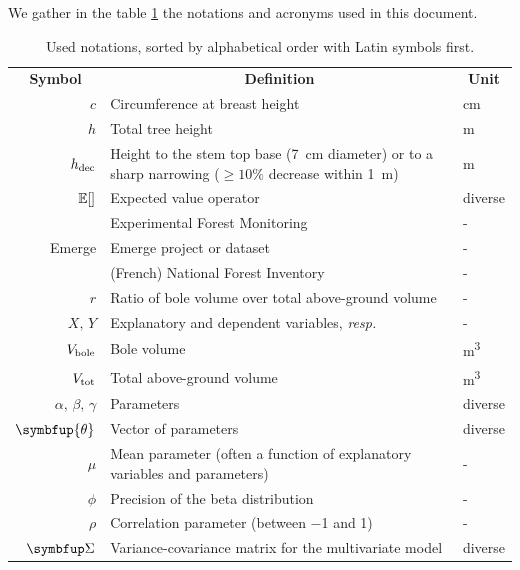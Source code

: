 We gather in the table \ref{tab::notations} the notations and acronyms used in this document.
\begin{table}[h]
	\centering
	\begin{tabular}{@{}rp{10cm}l@{}}
		\toprule
		\multicolumn{1}{c}{\textbf{Symbol}} & \multicolumn{1}{c}{\textbf{Definition}} & \multicolumn{1}{c}{\textbf{Unit}} \\
		\( c \) & Circumference at breast height & \si{\centi\metre} \\
		\( h \) & Total tree height & \si{\metre} \\
		\( h_{\text{dec}} \) & Height to the stem top base (\qty{7}{\centi\metre} diameter) or to a sharp narrowing (\( \geqslant 10\% \) decrease within \qty{1}{\metre}) & \si{\metre} \\
		\( \operatorname{\mathbb{E}}[] \) & Expected value operator & diverse \\
		\EFM & Experimental Forest Monitoring \parencite{Didion2024} & - \\
		Emerge & Emerge project or dataset \parencite{Deleuze2013} & - \\
		\NFI & (French) National Forest Inventory & - \\
		\( r \) & Ratio of bole volume over total above-ground volume & - \\
		\( X, \, Y \) & Explanatory and dependent variables, \textit{resp.} & - \\
		\( V_{\text{bole}} \) & Bole volume & \si{\cubic\metre} \\
		\( V_{\text{tot}} \) & Total above-ground volume & \si{\cubic\metre} \\
		\( \alpha, \, \beta, \, \gamma \) & Parameters & diverse \\
		\( \symbfup{\theta} \) & Vector of parameters & diverse \\
		\( \mu \) & Mean parameter (often a function of explanatory variables and parameters) & - \\
		\( \phi \) & Precision of the beta distribution & - \\
		\( \rho \) & Correlation parameter (between \num{-1} and \num{1}) & - \\
		\( \Sigmabf \) & Variance-covariance matrix for the multivariate model & diverse \\
		\bottomrule
	\end{tabular}
	\caption{Used notations, sorted by alphabetical order with Latin symbols first.\label{tab::notations}}
\end{table}
